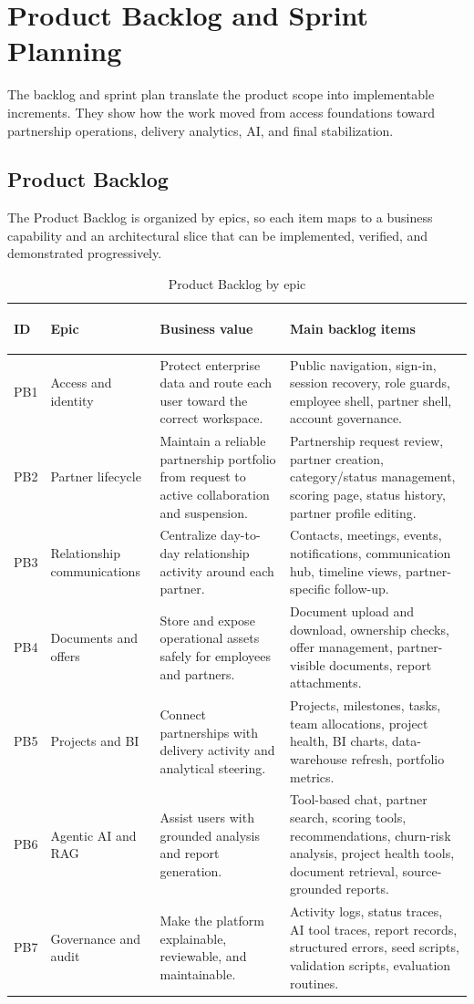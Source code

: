 \section{Product Backlog and Sprint Planning}
The backlog and sprint plan translate the product scope into implementable increments. They show how the work moved from access foundations toward partnership operations, delivery analytics, AI, and final stabilization.
\subsection{Product Backlog}
The Product Backlog is organized by epics, so each item maps to a business capability and an architectural slice that can be implemented, verified, and demonstrated progressively.

\begin{table}[H]
  \centering
  \caption{Product Backlog by epic}
  \begin{tabularx}{\textwidth}{>{\bfseries\raggedright\arraybackslash}p{1.2cm}>{\raggedright\arraybackslash}p{3.1cm}>{\raggedright\arraybackslash}p{3.4cm}X}
    \toprule
    ID & Epic & Business value & Main backlog items \\
    \midrule
    PB1 & Access and identity & Protect enterprise data and route each user toward the correct workspace. & Public navigation, sign-in, session recovery, role guards, employee shell, partner shell, account governance. \\
    PB2 & Partner lifecycle & Maintain a reliable partnership portfolio from request to active collaboration and suspension. & Partnership request review, partner creation, category/status management, scoring page, status history, partner profile editing. \\
    PB3 & Relationship communications & Centralize day-to-day relationship activity around each partner. & Contacts, meetings, events, notifications, communication hub, timeline views, partner-specific follow-up. \\
    PB4 & Documents and offers & Store and expose operational assets safely for employees and partners. & Document upload and download, ownership checks, offer management, partner-visible documents, report attachments. \\
    PB5 & Projects and BI & Connect partnerships with delivery activity and analytical steering. & Projects, milestones, tasks, team allocations, project health, BI charts, data-warehouse refresh, portfolio metrics. \\
    PB6 & Agentic AI and RAG & Assist users with grounded analysis and report generation. & Tool-based chat, partner search, scoring tools, recommendations, churn-risk analysis, project health tools, document retrieval, source-grounded reports. \\
    PB7 & Governance and audit & Make the platform explainable, reviewable, and maintainable. & Activity logs, status traces, AI tool traces, report records, structured errors, seed scripts, validation scripts, evaluation routines. \\
    \bottomrule
  \end{tabularx}
\end{table}
